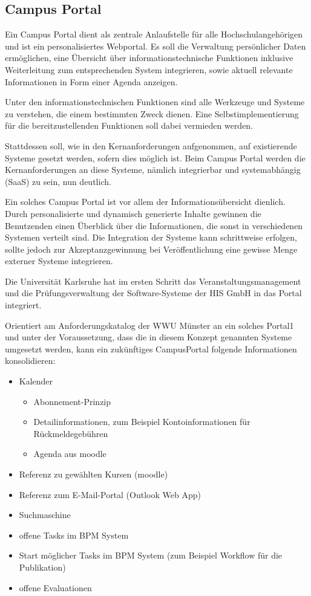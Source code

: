 \subsection{Campus Portal}
Ein Campus Portal dient als zentrale Anlaufstelle für alle Hochschulangehörigen und ist ein personalisiertes Webportal. Es soll die Verwaltung persönlicher Daten ermöglichen, eine Übersicht über informationstechnische Funktionen inklusive Weiterleitung zum entsprechenden System integrieren, sowie aktuell relevante Informationen in Form einer Agenda anzeigen.

Unter den informationstechnischen Funktionen sind alle Werkzeuge und Systeme zu verstehen, die einem bestimmten Zweck dienen. Eine Selbstimplementierung für die bereitzustellenden Funktionen soll dabei vermieden werden.

Stattdessen soll, wie in den Kernanforderungen aufgenommen, auf existierende Systeme gesetzt werden, sofern dies möglich ist. Beim Campus Portal werden die Kernanforderungen an diese Systeme, nämlich integrierbar und systemabhängig (SaaS) zu sein, nun deutlich.

Ein solches Campus Portal ist vor allem der Informationsübersicht dienlich. Durch personalisierte und dynamisch generierte Inhalte gewinnen die Benutzenden einen Überblick über die Informationen, die sonst in verschiedenen Systemen verteilt sind. Die Integration der Systeme kann schrittweise erfolgen, sollte jedoch zur Akzeptanzgewinnung bei Veröffentlichung eine gewisse Menge externer Systeme integrieren.

Die Universität Karlsruhe hat im ersten Schritt das Veranstaltungsmanagement und die Prüfungsverwaltung der Software-Systeme der HIS GmbH in das Portal integriert.

Orientiert am Anforderungskatalog der WWU Münster an ein solches Portal1 und unter der Voraussetzung, dass die in diesem Konzept genannten Systeme umgesetzt werden, kann ein zukünftiges CampusPortal folgende Informationen konsolidieren:

\begin{itemize}
	\item Kalender
	\begin{itemize}
		\item Abonnement-Prinzip
		\item Detailinformationen, zum Beispiel Kontoinformationen für Rückmeldegebühren
		\item Agenda aus moodle
	\end{itemize}
	\item Referenz zu gewählten Kursen (moodle)
	\item Referenz zum E-Mail-Portal (Outlook Web App)
	\item Suchmaschine
	\item offene Tasks im BPM System
	\item Start möglicher Tasks im BPM System (zum Beispiel Workflow für die Publikation)
	\item offene Evaluationen
\end{itemize}

